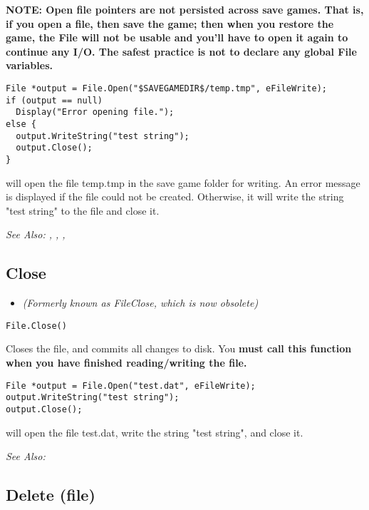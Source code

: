 \bf{NOTE:} Open file pointers are not persisted across save games. That is, if you open
a file, then save the game; then when you restore the game, the File will not be usable
and you'll have to open it again to continue any I/O. The safest practice is not to
declare any global File variables.

\begin{verbatim}
File *output = File.Open("$SAVEGAMEDIR$/temp.tmp", eFileWrite);
if (output == null)
  Display("Error opening file.");
else {
  output.WriteString("test string");
  output.Close();
}
\end{verbatim}
will open the file temp.tmp in the save game folder for writing. An error message is
displayed if the file could not be created. Otherwise, it will write the string "test string"
to the file and close it.

\it{See Also:} , ,
, 



\subsection{Close}\label{File.Close}%

\begin{itemize}
\item \it{(Formerly known as FileClose, which is now obsolete)}
\end{itemize}

\begin{verbatim}
File.Close()
\end{verbatim}
Closes the file, and commits all changes to disk.
You \bf{must} call this function when you have finished reading/writing the file.

\begin{verbatim}
File *output = File.Open("test.dat", eFileWrite);
output.WriteString("test string");
output.Close();
\end{verbatim}
will open the file test.dat, write the string "test string", and close it.

\it{See Also:} 


\subsection{Delete (file)}\label{File.Delete}%

